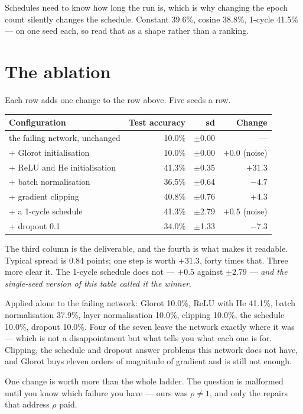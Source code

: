 \documentclass[11pt,a4paper]{article}
\begin{document}
Schedules need to know how long the run is, which is why changing the epoch
count silently changes the schedule. Constant 39.6\%, cosine 38.8\%, 1-cycle
41.5\% --- on one seed each, so read that as a shape rather than a ranking.

\section{The ablation}

Each row adds one change to the row above. Five seeds a row.

\begin{center}
\small
\begin{tabular}{lrrr}
\toprule
\textbf{Configuration} & \textbf{Test accuracy} & \textbf{sd} &
\textbf{Change} \\
\midrule
the failing network, unchanged & 10.0\% & $\pm$0.00 & --- \\
+ Glorot initialisation & 10.0\% & $\pm$0.00 & $+0.0$ (noise) \\
+ ReLU and He initialisation & 41.3\% & $\pm$0.35 & $\mathbf{+31.3}$ \\
+ batch normalisation & 36.5\% & $\pm$0.64 & $-4.7$ \\
+ gradient clipping & 40.8\% & $\pm$0.76 & $+4.3$ \\
+ a 1-cycle schedule & 41.3\% & $\pm$2.79 & $+0.5$ (noise) \\
+ dropout 0.1 & 34.0\% & $\pm$1.33 & $-7.3$ \\
\bottomrule
\end{tabular}
\end{center}

The third column is the deliverable, and the fourth is what makes it readable.
Typical spread is 0.84 points; one step is worth $+31.3$, forty times that.
Three more clear it. The 1-cycle schedule does not --- $+0.5$ against
$\pm2.79$ --- \emph{and the single-seed version of this table called it the
winner}.

Applied alone to the failing network: Glorot 10.0\%, ReLU with He 41.1\%, batch
normalisation 37.9\%, layer normalisation 10.0\%, clipping 10.0\%, the schedule
10.0\%, dropout 10.0\%. Four of the seven leave the network exactly where it
was --- which is not a disappointment but what tells you what each one is for.
Clipping, the schedule and dropout answer problems this network does not have,
and Glorot buys eleven orders of magnitude of gradient and is still not enough.

\begin{keybox}[title={The answer to ``should I add batch normalisation?''}]
One change is worth more than the whole ladder. The question is malformed until
you know which failure you have --- ours was $\rho \ne 1$, and only the repairs
that address $\rho$ paid.
\end{keybox}
\end{document}
